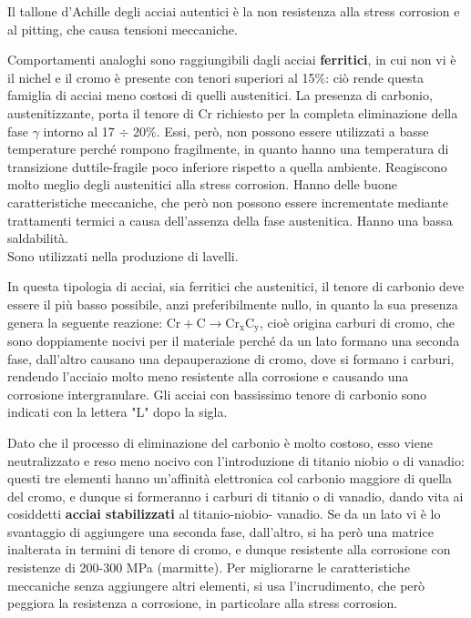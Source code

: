  Il tallone d’Achille degli acciai autentici è la non resistenza alla stress corrosion e al pitting, che causa tensioni meccaniche.
 
Comportamenti analoghi sono raggiungibili dagli acciai \textbf{ferritici}, in cui non vi è il nichel e il cromo è presente con tenori superiori al 15\%: ciò rende questa famiglia di acciai meno costosi di quelli austenitici. La presenza di carbonio, austenitizzante, porta il tenore di Cr richiesto per la completa eliminazione della fase $\gamma$ intorno al 17 $\div$ 20\%.
Essi, però, non possono essere utilizzati a basse temperature perché rompono fragilmente, in quanto hanno una temperatura di transizione duttile-fragile poco inferiore rispetto a quella ambiente. Reagiscono molto meglio degli austenitici alla stress corrosion. Hanno delle buone caratteristiche meccaniche, che però non possono essere incrementate mediante trattamenti termici a causa dell'assenza della fase austenitica. Hanno una bassa saldabilità.\\
Sono utilizzati nella produzione di lavelli.

In questa tipologia di acciai, sia ferritici che austenitici, il tenore di carbonio deve essere il più basso possibile, anzi preferibilmente nullo, in quanto la sua presenza genera la seguente reazione: $\mathrm{Cr + C \to Cr_xC_y}$, cioè origina carburi di cromo, che sono doppiamente nocivi per il materiale perché da un lato formano una seconda fase, dall’altro causano una depauperazione di cromo, dove si formano i carburi, rendendo l’acciaio molto meno resistente alla corrosione e causando una corrosione intergranulare. Gli acciai con bassissimo tenore di carbonio sono indicati con la lettera "L" dopo la sigla.

Dato che il processo di eliminazione del carbonio è molto costoso, esso viene neutralizzato e reso meno nocivo con l’introduzione di titanio niobio o di vanadio: questi tre elementi hanno un’affinità elettronica col carbonio maggiore di quella del cromo, e dunque si formeranno i carburi di titanio o di vanadio, dando vita ai cosiddetti \textbf{acciai stabilizzati} al titanio-niobio- vanadio. Se da un lato vi è lo svantaggio di aggiungere una seconda fase, dall’altro, si ha però una matrice inalterata in termini di tenore di cromo, e dunque resistente alla corrosione con resistenze di 200-300 MPa (marmitte).
Per migliorarne le caratteristiche meccaniche senza aggiungere altri elementi, si usa l’incrudimento, che però peggiora la resistenza a corrosione, in particolare alla stress corrosion.

